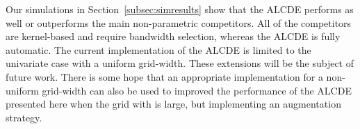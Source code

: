 \documentclass[12pt]{article} %
\begin{document}
Our simulations in Section~\ref{subsec:simresults} show that the ALCDE performs as well or outperforms the main non-parametric competitors.   All of the competitors are kernel-based and require bandwidth selection, whereas the ALCDE is fully automatic.   The current implementation of the ALCDE is limited to the univariate case with a uniform grid-width.   These extensions will be the subject of future work.  There is some hope that an appropriate implementation for a non-uniform grid-width can also be used to improved the performance of the ALCDE presented here when the grid with is large, but implementing an augmentation strategy.  











\end{document}
